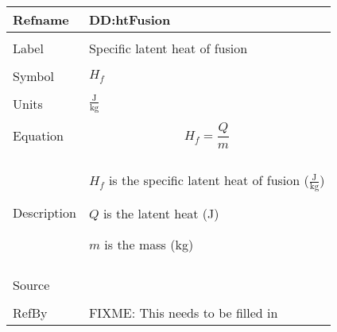 \documentclass[12pt]{article}
\begin{document}
\noindent \begin{minipage}{\textwidth}
\begin{tabular}{p{} p{}}
\toprule \textbf{Refname} & \textbf{DD:htFusion}
\label{DD:htFusion}
\\ \midrule \\
Label & Specific latent heat of fusion
\\ \midrule \\
Symbol & ${H_{f}}$
\\ \midrule \\
Units & $\frac{\text{J}}{\text{kg}}$
\\ \midrule \\
Equation & \begin{dmath}
           {H_{f}}=\frac{Q}{m}
           \end{dmath}
\\ \midrule \\
Description & \begin{symbDescription}
              \item{${H_{f}}$ is the specific latent heat of fusion ($\frac{\text{J}}{\text{kg}}$)}
              \item{$Q$ is the latent heat (J)}
              \item{$m$ is the mass (kg)}
              \end{symbDescription}
\\ \midrule \\
Source & 
\\ \midrule \\
RefBy & FIXME: This needs to be filled in
\\ \bottomrule \end{tabular}
\end{minipage}\\
~\newline
\end{document}
